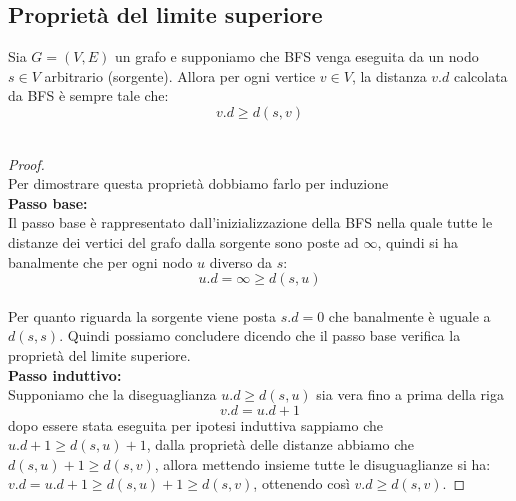 \subsection{Proprietà del limite superiore}
Sia $G = (V, E)$ un grafo e supponiamo che BFS venga eseguita da un nodo $s \in V$ arbitrario
(sorgente). Allora per ogni vertice $v \in V$, la distanza $v.d$ calcolata da BFS è sempre tale che:\\
$$v.d \ge d(s,v)$$\\
\begin{proof}
    \leavevmode\\
    Per dimostrare questa proprietà dobbiamo farlo per induzione\\
    \textbf{Passo base:}\\
    Il passo base è rappresentato dall’inizializzazione della BFS nella quale tutte le distanze dei
    vertici del grafo dalla sorgente sono poste ad $\infty$, quindi si ha banalmente che per ogni nodo $u$
    diverso da $s$:\\
    $$u.d= \infty \ge d(s,u)$$\\
    Per quanto riguarda la sorgente viene posta $s.d= 0$ che banalmente è uguale a $d(s, s)$. Quindi
    possiamo concludere dicendo che il passo base verifica la proprietà del limite superiore.\\
    \textbf{Passo induttivo:}\\
    Supponiamo che la diseguaglianza $u.d \ge d(s,u)$ sia vera fino a prima della riga
    $$v.d= u.d + 1$$
    dopo essere stata eseguita per ipotesi induttiva sappiamo che $u.d + 1 \ge d(s,u) + 1$, dalla proprietà 
    delle distanze abbiamo che $d(s,u) + 1 \ge d(s,v)$, allora mettendo insieme tutte le disuguaglianze 
    si ha: $v.d= u.d + 1 \ge d(s,u) + 1 \ge d(s,v)$, ottenendo così $v.d \ge d(s,v)$.
\end{proof}
